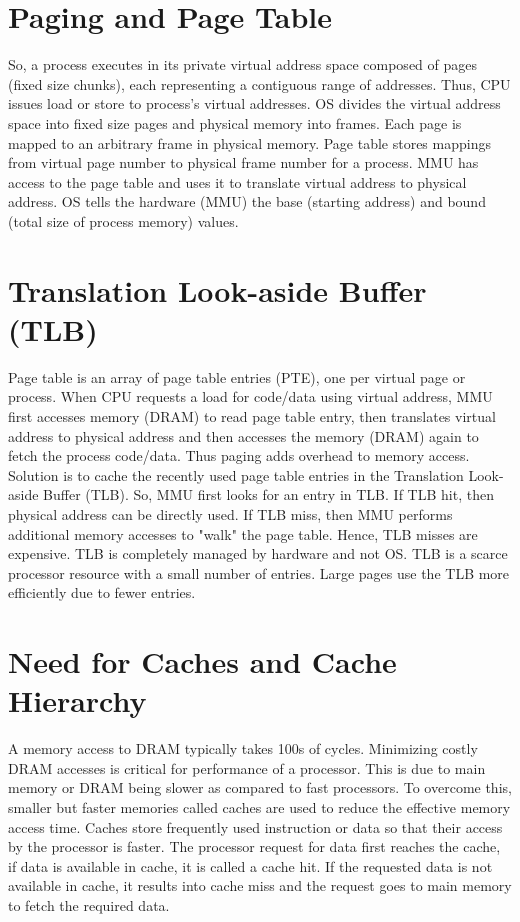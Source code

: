 \documentclass[a4paper,12pt, final]{report}
\begin{document}
\section{Paging and Page Table}
So, a process executes in its private virtual address space composed of pages (fixed size chunks), each representing a contiguous range of addresses. Thus, CPU issues load or store to process's virtual addresses. OS divides the virtual address space into fixed size pages and physical memory into frames. Each page is mapped to an arbitrary frame in physical memory. Page table stores mappings from virtual page number to physical frame number for a process. MMU has access to the page table and uses it to translate virtual address to physical address. OS tells the hardware (MMU) the base (starting address) and bound (total size of process memory) values.

\section{Translation Look-aside Buffer (TLB)}
Page table is an array of page table entries (PTE), one per virtual page or process. When CPU requests a load for code/data using virtual address, MMU first accesses memory (DRAM) to read page table entry, then translates virtual address to physical address and then accesses the memory (DRAM) again to fetch the process code/data. Thus paging adds overhead to memory access. Solution is to cache the recently used page table entries in the Translation Look-aside Buffer (TLB). So, MMU first looks for an entry in TLB. If TLB hit, then physical address can be directly used. If TLB miss, then MMU performs additional memory accesses to "walk" the page table. Hence, TLB misses are expensive. TLB is completely managed by hardware and not OS. TLB is a scarce processor resource with a small number of entries. Large pages use the TLB more efficiently due to fewer entries.

\section{Need for Caches and Cache Hierarchy}
A memory access to DRAM typically takes 100s of cycles. Minimizing costly DRAM accesses is critical for performance of a processor. This is due to main memory or DRAM being slower as compared to fast processors. To overcome this, smaller but faster memories called caches are used to reduce the effective memory access time. Caches store frequently used instruction or data so that their access by the processor is faster. The processor request for data first reaches the cache, if data is available in cache, it is called a cache hit. If the requested data is not available in cache, it results into cache miss and the request goes to main memory to fetch the required data.
\end{document}
